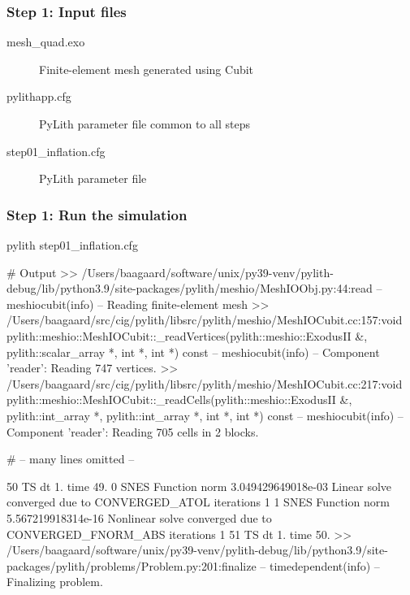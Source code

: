 \documentclass[aspectratio=169]{beamer}
\begin{document}
\begin{frame}[t,fragile]
    

  
\end{frame}


\begin{frame}
  \frametitle{Step 1: Input files}
  \summary{}

  \begin{description}
  \item[mesh\_quad.exo] Finite-element mesh generated using Cubit
  \item[pylithapp.cfg] PyLith parameter file common to all steps
  \item[step01\_inflation.cfg] PyLith parameter file
  \end{description}
    
\end{frame}


\begin{frame}[fragile]
  \frametitle{Step 1: Run the simulation}
  \summary{}

\begin{bashcode}
pylith step01_inflation.cfg

# Output
 >> /Users/baagaard/software/unix/py39-venv/pylith-debug/lib/python3.9/site-packages/pylith/meshio/MeshIOObj.py:44:read
 -- meshiocubit(info)
 -- Reading finite-element mesh
 >> /Users/baagaard/src/cig/pylith/libsrc/pylith/meshio/MeshIOCubit.cc:157:void pylith::meshio::MeshIOCubit::_readVertices(pylith::meshio::ExodusII &, pylith::scalar_array *, int *, int *) const
 -- meshiocubit(info)
 -- Component 'reader': Reading 747 vertices.
 >> /Users/baagaard/src/cig/pylith/libsrc/pylith/meshio/MeshIOCubit.cc:217:void pylith::meshio::MeshIOCubit::_readCells(pylith::meshio::ExodusII &, pylith::int_array *, pylith::int_array *, int *, int *) const
 -- meshiocubit(info)
 -- Component 'reader': Reading 705 cells in 2 blocks.

# -- many lines omitted --

50 TS dt 1. time 49.
    0 SNES Function norm 3.049429649018e-03
    Linear solve converged due to CONVERGED_ATOL iterations 1
    1 SNES Function norm 5.567219918314e-16
  Nonlinear solve converged due to CONVERGED_FNORM_ABS iterations 1
51 TS dt 1. time 50.
 >> /Users/baagaard/software/unix/py39-venv/pylith-debug/lib/python3.9/site-packages/pylith/problems/Problem.py:201:finalize
 -- timedependent(info)
 -- Finalizing problem.
\end{bashcode}
  
\end{frame}
\end{document}

